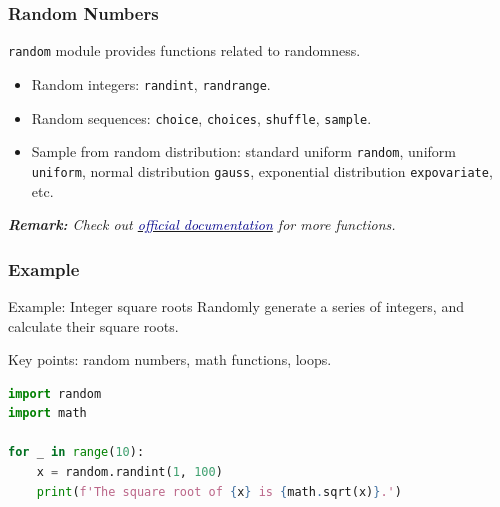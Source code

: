 \documentclass[beamer, en, version=2.0]{huangfusl-template}
\begin{document}
    \begin{frame}[fragile]
        \frametitle{Random Numbers}

        {\footnotesize\verb|random|} module provides functions related to randomness.

        \begin{itemize}
            \item Random integers: {\footnotesize\verb|randint|}, {\footnotesize\verb|randrange|}.
            \item Random sequences: {\footnotesize\verb|choice|}, {\footnotesize\verb|choices|}, {\footnotesize\verb|shuffle|}, {\footnotesize\verb|sample|}.
            \item Sample from random distribution: standard uniform {\footnotesize\verb|random|}, uniform {\footnotesize\verb|uniform|}, normal distribution {\footnotesize\verb|gauss|}, exponential distribution {\footnotesize\verb|expovariate|}, etc.
        \end{itemize}

        {\footnotesize\itshape\textbf{Remark:} Check out \href{https://docs.python.org/3/library/random.html}{\textcolor{darkblue}{official documentation}} for more functions.}
    \end{frame}
    \begin{frame}[fragile]
        \frametitle{Example}

        \begin{block}{Example: Integer square roots}
            Randomly generate a series of integers, and calculate their square roots.
        \end{block}

        Key points: random numbers, math functions, loops.

        \pause

\begin{lstlisting}[language=python]
import random
import math

for _ in range(10):
    x = random.randint(1, 100)
    print(f'The square root of {x} is {math.sqrt(x)}.')
\end{lstlisting}
    \end{frame}
\end{document}
